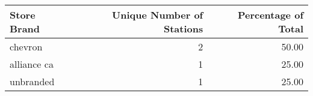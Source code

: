 \begin{tabular}{lrr}
\toprule
\textbf{Store Brand} & \textbf{Unique Number of Stations} & \textbf{Percentage of Total} \\
\midrule
chevron & 2 & 50.00 \\
alliance ca & 1 & 25.00 \\
unbranded & 1 & 25.00 \\
\bottomrule
\end{tabular}
